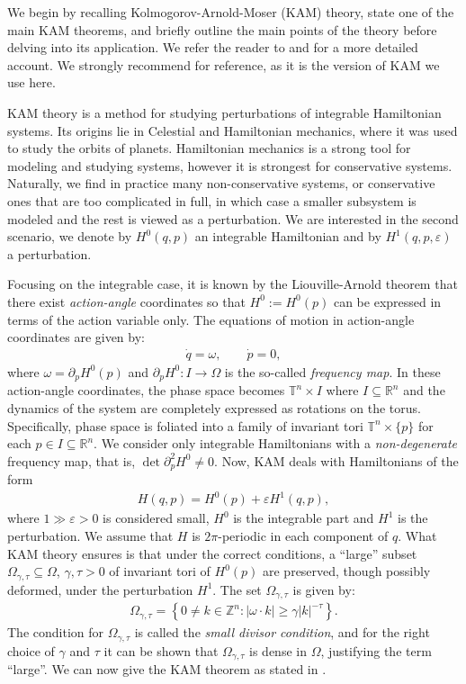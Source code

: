 
We begin by recalling Kolmogorov-Arnold-Moser (KAM) theory, state one of the main KAM theorems, and briefly outline the main points of the theory before delving into its application. We refer the reader to \cite{Knauf_2018} and \cite{Seri_2022} for a more detailed account. We strongly recommend \cite{poschel82} for reference, as it is the version of KAM we use here. 


KAM theory is a method for studying perturbations of integrable Hamiltonian systems. Its origins lie in Celestial and Hamiltonian mechanics, where it was used to study the orbits of planets. Hamiltonian mechanics is a strong tool for modeling and studying systems, however it is strongest for conservative systems. Naturally, we find in practice many non-conservative systems, or conservative ones that are too complicated in full, in which case a smaller subsystem is modeled and the rest is viewed as a perturbation. We are interested in the second scenario, we denote by $H^0(q,p)$ an integrable Hamiltonian and by $H^1(q,p,\varepsilon)$ a perturbation. 

Focusing on the integrable case, it is known by the Liouville-Arnold theorem that there exist \textit{action-angle} coordinates so that $H^0:=H^0(p)$ can be expressed in terms of the action variable only. The equations of motion in action-angle coordinates are given by:
\begin{align*}
\dot q = \omega, \qquad \dot p = 0,
\end{align*}
where $\omega = \partial_pH^0(p)$ and $\partial_p H^0:I\to\Omega$ is the so-called \textit{frequency map}. In these action-angle coordinates, the phase space becomes $\mathbb T^n\times I$ where $I\subseteq\mathbb R^n$ and the dynamics of the system are completely expressed as rotations on the torus. Specifically, phase space is foliated into a family of invariant tori $\mathbb T^n\times\{p\}$ for each $p\in I\subseteq \mathbb R^n$. We consider only integrable Hamiltonians with a \textit{non-degenerate} frequency map, that is, $\det\partial_p^2 H^0\neq 0$. Now, KAM deals with Hamiltonians of the form
\begin{align*}
H(q,p) = H^0(p) + \varepsilon H^1(q,p),
\end{align*}
where $1\gg\varepsilon>0$ is considered small, $H^0$ is the integrable part and $H^1$ is the perturbation. We assume that $H$ is $2\pi$-periodic in each component of $q$. What KAM theory ensures is that under the correct conditions, a ``large'' subset $\Omega_{\gamma,\tau}\subseteq\Omega$, $\gamma,\tau>0$ of invariant tori of $H^0(p)$ are preserved, though possibly deformed, under the perturbation $H^1$. The set $\Omega_{\gamma,\tau}$ is given by:
\begin{align}\label{eq:smalldivisorcondition}
\Omega_{\gamma,\tau} = \left\{ 0\neq k\in \mathbb Z^n :
|\omega \cdot k| \ge \gamma|k|^{-\tau}\right\}.
\end{align}
The condition for $\Omega_{\gamma,\tau}$ is called the \textit{small divisor condition}, and for the right choice of $\gamma$ and $\tau$ it can be shown that $\Omega_{\gamma,\tau}$ is dense in $\Omega$, justifying the term ``large''. We can now give the KAM theorem as stated in \cite{poschel82}.

